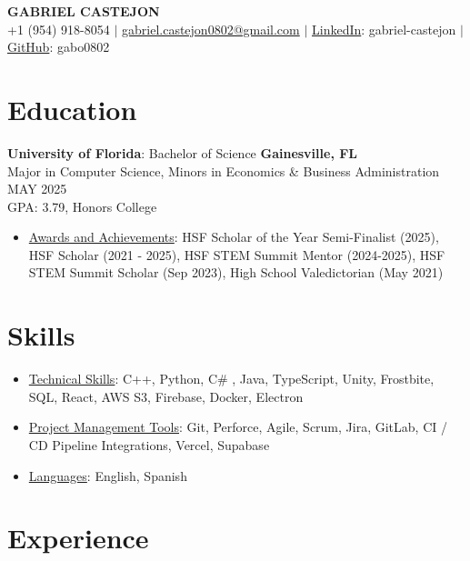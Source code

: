 \documentclass[10pt, letterpaper]{article}
\begin{document}
\pagestyle{empty}

\begin{center}
    \textbf{\huge GABRIEL CASTEJON} \\ \vspace{1.5mm}
    +1 (954) 918-8054 $|$ \href{mailto:gabriel.castejon0802@gmail.com}{gabriel.castejon0802@gmail.com} $|$ \href{https://linkedin.com/in/gabriel-castejon}{LinkedIn}: gabriel-castejon $|$ \href{https://github.com/gabo0802}{GitHub}: gabo0802 
\end{center}

\section*{Education}
\noindent\textbf{University of Florida}: Bachelor of Science \hfill \textbf{Gainesville, FL} \\
Major in Computer Science, Minors in Economics \& Business Administration \hfill MAY 2025 \\
GPA: 3.79, Honors College

\begin{itemize}[leftmargin=0pt, label={}, noitemsep, topsep=0pt, itemsep=0pt]
    \item \underline{Awards and Achievements}: HSF Scholar of the Year Semi-Finalist (2025), HSF Scholar (2021 - 2025), HSF STEM Summit Mentor (2024-2025), HSF STEM Summit Scholar (Sep 2023), High School Valedictorian (May 2021)
\end{itemize}

\section*{Skills}
\begin{itemize}[leftmargin=0pt, label={}, noitemsep, topsep=0pt, itemsep=0pt]
    \item \underline{Technical Skills}: C++, Python, C\# , Java, TypeScript, Unity, Frostbite, SQL, React, AWS S3, Firebase, Docker, Electron
    \item \underline{Project Management Tools}: Git, Perforce, Agile, Scrum, Jira, GitLab, CI / CD Pipeline Integrations, Vercel, Supabase
    \item \underline{Languages}: English, Spanish
\end{itemize}

\section*{Experience}
\end{document}
